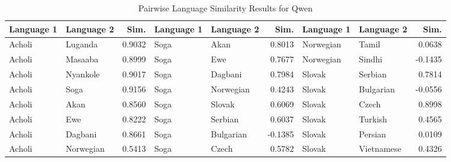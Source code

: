 \documentclass[11pt]{article} %
\begin{document}
    \begin{table}
        [p]
        \centering
        \caption{Pairwise Language Similarity Results for Qwen}
        \label{tab:qwen-sim} \tiny
        \setlength{\tabcolsep}{3.2pt}
        \renewcommand{\arraystretch}{0.9}
        \begin{tabular}{llr@{\hspace{12pt}}llr@{\hspace{12pt}}llr}
            \toprule \textbf{Language 1} & \textbf{Language 2} & \textbf{Sim.} & \textbf{Language 1} & \textbf{Language 2} & \textbf{Sim.} & \textbf{Language 1} & \textbf{Language 2} & \textbf{Sim.} \\
            \midrule Acholi              & Luganda             & 0.9032        & Soga                & Akan                & 0.8013        & Norwegian           & Tamil               & 0.0638        \\
            Acholi                       & Masaaba             & 0.8999        & Soga                & Ewe                 & 0.7677        & Norwegian           & Sindhi              & -0.1435       \\
            Acholi                       & Nyankole            & 0.9017        & Soga                & Dagbani             & 0.7984        & Slovak              & Serbian             & 0.7814        \\
            Acholi                       & Soga                & 0.9156        & Soga                & Norwegian           & 0.4243        & Slovak              & Bulgarian           & -0.0556       \\
            Acholi                       & Akan                & 0.8560        & Soga                & Slovak              & 0.6069        & Slovak              & Czech               & 0.8998        \\
            Acholi                       & Ewe                 & 0.8222        & Soga                & Serbian             & 0.6037        & Slovak              & Turkish             & 0.4565        \\
            Acholi                       & Dagbani             & 0.8661        & Soga                & Bulgarian           & -0.1385       & Slovak              & Persian             & 0.0109        \\
            Acholi                       & Norwegian           & 0.5413        & Soga                & Czech               & 0.5782        & Slovak              & Vietnamese          & 0.4326        \\

\end{tabular}
\end{table}
\end{document}
